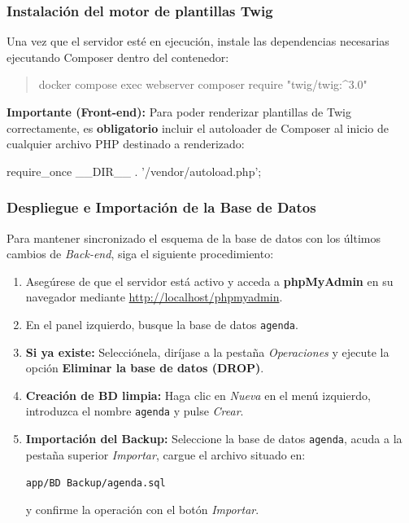 \subsubsection{Instalación del motor de plantillas Twig}
Una vez que el servidor esté en ejecución, instale las dependencias necesarias ejecutando Composer dentro del contenedor:

\begin{quote}
\small\ttfamily
docker compose exec webserver composer require "twig/twig:\^{}3.0"
\end{quote}

\vspace{0.3cm}
\noindent
\colorbox{azulclaro!40}{%
  \parbox{\dimexpr\textwidth-2\fboxsep\relax}{%
    \vspace{6pt}
    \textbf{\color{textoOscuro}Importante (Front-end):} Para poder renderizar plantillas de Twig correctamente, es \textbf{obligatorio} incluir el autoloader de Composer al inicio de cualquier archivo PHP destinado a renderizado:
    
    \vspace{4pt}
    {\small\ttfamily\hspace*{1em}require\_once \_\_DIR\_\_ . '/vendor/autoload.php';}
    \vspace{4pt}
  }%
}
\vspace{0.3cm}

\vspace{0.5cm}
\subsubsection{Despliegue e Importación de la Base de Datos}
Para mantener sincronizado el esquema de la base de datos con los últimos cambios de \textit{Back-end}, siga el siguiente procedimiento:

\begin{enumerate}
    \item Asegúrese de que el servidor está activo y acceda a \textbf{phpMyAdmin} en su navegador mediante \url{http://localhost/phpmyadmin}.
    \item En el panel izquierdo, busque la base de datos \texttt{agenda}. 
    \item \textbf{Si ya existe:} Selecciónela, diríjase a la pestaña \textit{Operaciones} y ejecute la opción \textbf{Eliminar la base de datos (DROP)}.
    \item \textbf{Creación de BD limpia:} Haga clic en \textit{Nueva} en el menú izquierdo, introduzca el nombre \texttt{agenda} y pulse \textit{Crear}.
    \item \textbf{Importación del Backup:} Seleccione la base de datos \texttt{agenda}, acuda a la pestaña superior \textit{Importar}, cargue el archivo situado en:
    \begin{center}
        \texttt{app/BD Backup/agenda.sql}
    \end{center}
    y confirme la operación con el botón \textit{Importar}.
\end{enumerate}

